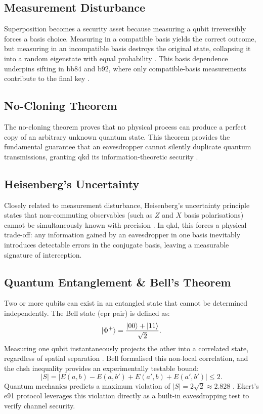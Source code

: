 \documentclass[11pt, a4paper]{report}
\begin{document}
\subsection{Measurement Disturbance}
Superposition becomes a security asset because measuring a \gls{qubit} irreversibly forces a basis choice. Measuring in a compatible basis yields the correct outcome, but measuring in an incompatible basis destroys the original state, collapsing it into a random eigenstate with equal probability \cite{QKDbible}. This basis dependence underpins \gls{sifting} in \gls{bb84} and \gls{b92}, where only compatible-basis measurements contribute to the final key \cite{BB84, B92}.

\subsection{No-Cloning Theorem}
The no-cloning theorem \cite{WZ1982, Dieks1982} proves that no physical process can produce a perfect copy of an arbitrary unknown quantum state. This theorem provides the fundamental guarantee that an eavesdropper cannot silently duplicate quantum transmissions, granting \gls{qkd} its information-theoretic security \cite{ekertQI}.

\subsection{Heisenberg's Uncertainty}
Closely related to measurement disturbance, Heisenberg's uncertainty principle \cite{Heisenberg1927} states that non-commuting observables (such as $Z$ and $X$ basis polarisations) cannot be simultaneously known with precision \cite{QKDbible}. In \gls{qkd}, this forces a physical trade-off: any information gained by an eavesdropper in one basis inevitably introduces detectable errors in the conjugate basis, leaving a measurable signature of interception.

\newpage
\subsection{Quantum Entanglement \& Bell's Theorem}
Two or more \glspl{qubit} can exist in an entangled state that cannot be determined independently. The Bell state (\gls{epr} pair) \cite{EPR1935} is defined as:
%
\begin{equation}
\label{eq:bell-state}
\ket{\Phi^{+}} = \frac{\ket{00}+\ket{11}}{\sqrt{2}}.
\end{equation}
%
Measuring one \gls{qubit} instantaneously projects the other into a correlated state, regardless of spatial separation \cite{QKDbible}. Bell \cite{Bell1964} formalised this non-local correlation, and the \gls{chsh} inequality \cite{CHSH1969} provides an experimentally testable bound:
%
\begin{equation}
\label{eq:chsh}
|S| = |E(a,b) - E(a,b') + E(a',b) + E(a',b')| \leq 2.
\end{equation}
%
Quantum mechanics predicts a maximum violation of $|S| = 2\sqrt{2} \approx 2.828$ \cite{Aspect1982}. Ekert's \gls{e91} protocol \cite{E91} leverages this violation directly as a built-in eavesdropping test to verify channel security.
\end{document}
